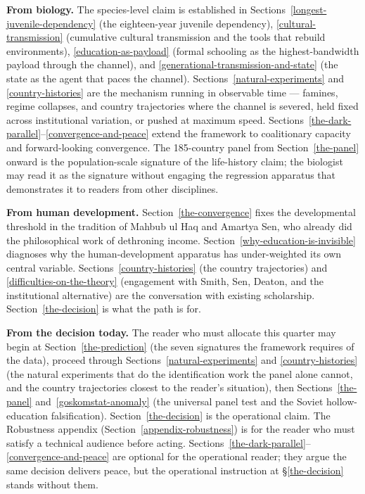 \documentclass[12pt,letterpaper]{article}
\begin{document}
\textbf{From biology.} The species-level claim is established in
Sections~\ref{longest-juvenile-dependency} (the eighteen-year juvenile
dependency), \ref{cultural-transmission} (cumulative cultural
transmission and the tools that rebuild environments),
\ref{education-as-payload} (formal schooling as the highest-bandwidth
payload through the channel), and \ref{generational-transmission-and-state} (the state as the
agent that paces the channel).
Sections~\ref{natural-experiments} and \ref{country-histories} are
the mechanism running in observable time --- famines, regime
collapses, and country trajectories where the channel is severed,
held fixed across institutional variation, or pushed at maximum
speed. Sections~\ref{the-dark-parallel}--\ref{convergence-and-peace}
extend the framework to coalitionary capacity and forward-looking
convergence. The 185-country panel from Section~\ref{the-panel}
onward is the population-scale signature of the life-history claim;
the biologist may read it as the signature without engaging the
regression apparatus that demonstrates it to readers from other
disciplines.

\textbf{From human development.} Section~\ref{the-convergence} fixes
the developmental threshold in the tradition of Mahbub ul Haq and Amartya Sen, who
already did the philosophical work of dethroning income. Section~\ref{why-education-is-invisible} diagnoses why the
human-development apparatus has under-weighted its own central
variable. Sections~\ref{country-histories} (the country trajectories) and
\ref{difficulties-on-the-theory} (engagement with Smith, Sen, Deaton,
and the institutional alternative) are the conversation with existing
scholarship. Section~\ref{the-decision} is what the path is for.

\textbf{From the decision today.} The reader who must allocate this
quarter may begin at Section~\ref{the-prediction} (the seven
signatures the framework requires of the data), proceed through
Sections~\ref{natural-experiments} and \ref{country-histories} (the
natural experiments that do the identification work the panel alone
cannot, and the country trajectories closest to the reader's
situation), then Sections~\ref{the-panel} and~\ref{goskomstat-anomaly}
(the universal panel test and the Soviet hollow-education
falsification). Section~\ref{the-decision} is the operational
claim. The Robustness appendix (Section~\ref{appendix-robustness}) is
for the reader who must satisfy a technical audience before acting.
Sections~\ref{the-dark-parallel}--\ref{convergence-and-peace} are
optional for the operational reader; they argue the same decision
delivers peace, but the operational instruction at
\S\ref{the-decision} stands without them.
\end{document}
